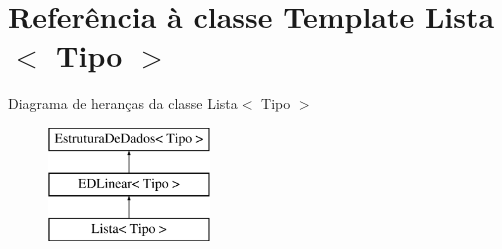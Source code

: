 \hypertarget{classLista}{\section{Referência à classe Template Lista$<$ Tipo $>$}
\label{classLista}
}
Diagrama de heranças da classe Lista$<$ Tipo $>$\begin{figure}[H]
\begin{center}
\leavevmode
\includegraphics[height=3.000000cm]{classLista}
\end{center}
\end{figure}
